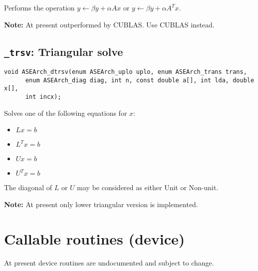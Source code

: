 \documentclass{article}
\begin{document}
\noindent
Performs the operation $y \leftarrow \beta y + \alpha Ax$ or $y\leftarrow \beta y + \alpha A^Tx$.

\noindent
\textbf{Note:} At present outperformed by CUBLAS. Use CUBLAS instead.

\subsection{\texttt{\_trsv}: Triangular solve}
\begin{verbatim}
void ASEArch_dtrsv(enum ASEArch_uplo uplo, enum ASEArch_trans trans,
      enum ASEArch_diag diag, int n, const double a[], int lda, double x[],
      int incx);
\end{verbatim}

\noindent
Solves one of the following equations for $x$:
\begin{itemize}
   \item $Lx = b$
   \item $L^Tx = b$
   \item $Ux = b$
   \item $U^Tx = b$
\end{itemize}
The diagonal of $L$ or $U$ may be considered as either Unit or Non-unit.

\noindent
\textbf{Note:} At present only lower triangular version is implemented.

\section{Callable routines (device)}
At present device routines are undocumented and subject to change.
\end{document}
